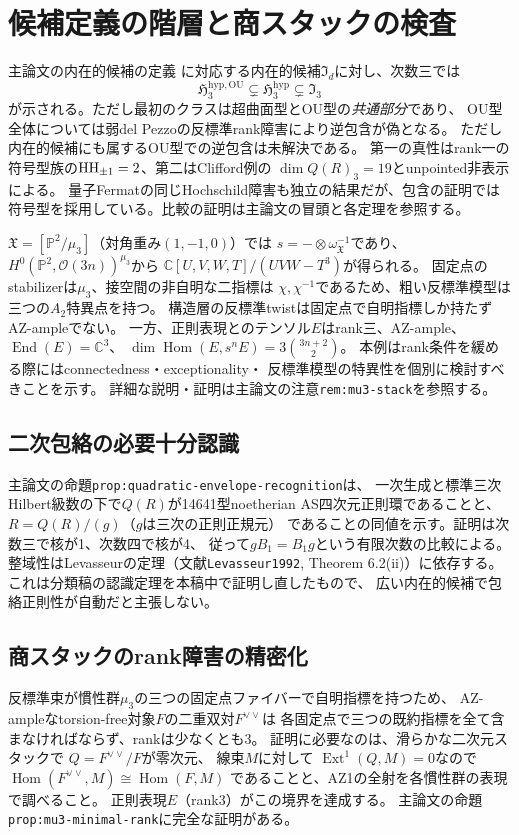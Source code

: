 \documentclass[11pt,a4paper]{ltjsarticle}
\begin{document}
\section{候補定義の階層と商スタックの検査}
主論文の内在的候補の定義
に対応する内在的候補$\mathfrak I_d$に対し、次数三では
\[
 \mathfrak H^{\mathrm{hyp,OU}}_3
 \subsetneq\mathfrak H^{\mathrm{hyp}}_3
 \subsetneq\mathfrak I_3
\]
が示される。ただし最初のクラスは超曲面型とOU型の\emph{共通部分}であり、
OU型全体については弱del Pezzoの反標準rank障害により逆包含が偽となる。
ただし内在的候補にも属するOU型での逆包含は未解決である。
第一の真性はrank一の符号型族の$\operatorname{HH}_{\pm1}=2$、第二はClifford例の
$\dim Q(R)_3=19$とunpointed非表示による。
量子Fermatの同じHochschild障害も独立の結果だが、包含の証明では符号型を採用している。比較の証明は主論文の冒頭と各定理を参照する。

$\mathfrak X=[\mathbb P^2/\mu_3]$（対角重み$(1,-1,0)$）では
$s=-\otimes\omega_{\mathfrak X}^{-1}$であり、
$H^0(\mathbb P^2,\mathcal O(3n))^{\mu_3}$から
$\mathbb C[U,V,W,T]/(UVW-T^3)$が得られる。
固定点のstabilizerは$\mu_3$、接空間の非自明な二指標は
$\chi,\chi^{-1}$であるため、粗い反標準模型は三つの$A_2$特異点を持つ。
構造層の反標準twistは固定点で自明指標しか持たずAZ-ampleでない。
一方、正則表現とのテンソル$E$はrank三、AZ-ample、
$\operatorname{End}(E)=\mathbb C^3$、
$\dim\operatorname{Hom}(E,s^nE)=3\binom{3n+2}{2}$。
本例はrank条件を緩める際にはconnectedness・exceptionality・
反標準模型の特異性を個別に検討すべきことを示す。
詳細な説明・証明は主論文の注意\texttt{rem:mu3-stack}を参照する。

\subsection*{二次包絡の必要十分認識}
主論文の命題\texttt{prop:quadratic-envelope-recognition}は、
一次生成と標準三次Hilbert級数の下で$Q(R)$が14641型noetherian
AS四次元正則環であることと、$R=Q(R)/(g)$（$g$は三次の正則正規元）
であることの同値を示す。証明は次数三で核が1、次数四で核が4、
従って$gB_1=B_1g$という有限次数の比較による。
整域性はLevasseurの定理（文献\texttt{Levasseur1992}, Theorem 6.2(ii)）に依存する。
これは分類稿の認識定理を本稿中で証明し直したもので、
広い内在的候補で包絡正則性が自動だと主張しない。

\subsection*{商スタックのrank障害の精密化}
反標準束が慣性群$\mu_3$の三つの固定点ファイバーで自明指標を持つため、
AZ-ampleなtorsion-free対象$F$の二重双対$F^{\vee\vee}$は
各固定点で三つの既約指標を全て含まなければならず、rankは少なくとも3。
証明に必要なのは、滑らかな二次元スタックで
$Q=F^{\vee\vee}/F$が零次元、
線束$M$に対して
$\operatorname{Ext}^1(Q,M)=0$なので
$\operatorname{Hom}(F^{\vee\vee},M)\cong\operatorname{Hom}(F,M)$
であることと、AZ1の全射を各慣性群の表現で調べること。
正則表現$E$（rank3）がこの境界を達成する。
主論文の命題\texttt{prop:mu3-minimal-rank}に完全な証明がある。
\end{document}
